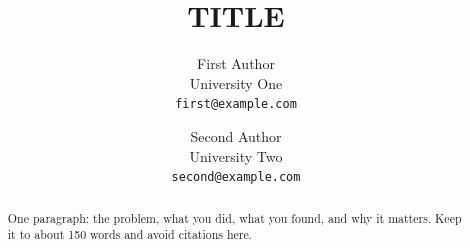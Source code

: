 \documentclass[10pt,twocolumn,letterpaper]{article}
\title{{{TITLE}}}
\author{First Author\\
University One\\
{\tt\small first@example.com}
\and
Second Author\\
University Two\\
{\tt\small second@example.com}
}
\begin{document}
\maketitle

\begin{abstract}
One paragraph: the problem, what you did, what you found, and why it matters. Keep it to about 150 words and avoid citations here.
\end{abstract}




{
  \small
  
  
}
\end{document}
